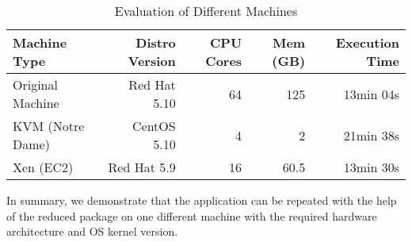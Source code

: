 \begin{table}
    \centering
    \begin{tabular}{lrrrr}
    \hline
    \bf Machine Type & \bf Distro Version & \bf CPU Cores & \bf Mem (GB) & \bf Execution Time \\ \hline 
    Original Machine &  Red Hat 5.10 & 64 & 125 & 13min 04s\\  \hline
    KVM (Notre Dame) & CentOS 5.10 & 4 & 2 & 21min 38s\\ \hline
    Xen (EC2) & Red Hat 5.9 & 16 & 60.5 & 13min 30s\\ \hline
    \end{tabular}
    \caption{Evaluation of Different Machines}
    \label{table:config-vm}
\end{table}

In summary, we demonstrate that the application can be repeated with the help of the reduced package on one different machine with the required hardware architecture and OS kernel version.

